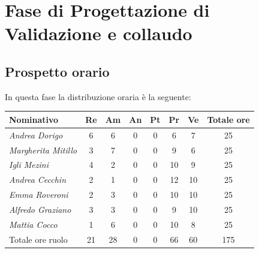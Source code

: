 {{{{{{{{\section{Fase di Progettazione di Validazione e collaudo}\label{PreventivoFaseDiProgettazionediValidazioneECollaudo}

\subsection{Prospetto orario}\label{PreventivoPreventivoFaseDiProgettazionediValidazioneECollaudoProspettoOrario}
In questa fase la distribuzione oraria è la seguente:
\quad
\def\tabularxcolumn#1{m{#1}}
{

	\begin{center}
		\renewcommand{\arraystretch}{1.4}
		\begin{tabularx}{\textwidth}{|X|c|c|c|c|c|c|c|}
			\hline
			\rowcolor{airforceblue}
			\textbf{Nominativo} & \textbf{Re} & \textbf{Am} & \textbf{An} & \textbf{Pt} & \textbf{Pr} & \textbf{Ve} & \textbf{Totale ore}\\
			\hline
			\textit{Andrea Dorigo} & 6 & 6 & 0 & 0 & 6 & 7 & 25\\
			\hline
			\textit{Margherita Mitillo} & 3 & 7 & 0 & 0 & 9 & 6 & 25\\
			\hline
			\textit{Igli Mezini} & 4 & 2 & 0 & 0 & 10 & 9 & 25\\
			\hline
			\textit{Andrea Cecchin} & 2 & 1 & 0 & 0 & 12 & 10 & 25\\
			\hline
			\textit{Emma Roveroni} & 2 & 3 & 0 & 0 & 10 & 10 & 25\\
			\hline
			\textit{Alfredo Graziano} & 3 & 3 & 0 & 0 & 9 & 10 & 25\\
			\hline
			\textit{Mattia Cocco} & 1 & 6 & 0 & 0 & 10 & 8 & 25\\
			\hline
			Totale ore ruolo & 21 & 28 & 0 & 0 & 66 & 60 & 175\\
			\hline
		\end{tabularx}
	\end{center}

}}}}}}}}}
